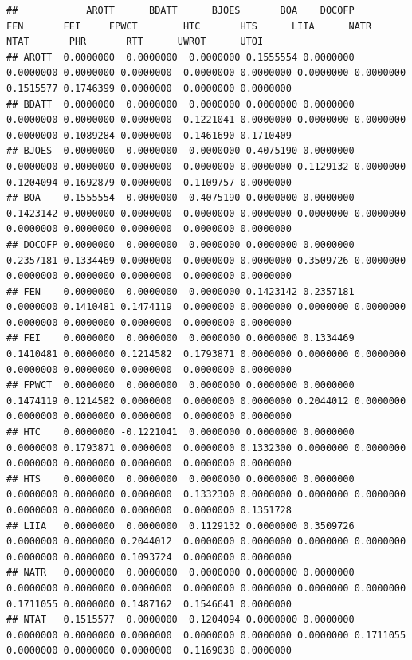\documentclass[
]{book}
\begin{document}
\begin{verbatim}
##            AROTT      BDATT      BJOES       BOA    DOCOFP       FEN       FEI     FPWCT        HTC       HTS      LIIA      NATR      NTAT       PHR       RTT      UWROT      UTOI
## AROTT  0.0000000  0.0000000  0.0000000 0.1555554 0.0000000 0.0000000 0.0000000 0.0000000  0.0000000 0.0000000 0.0000000 0.0000000 0.1515577 0.1746399 0.0000000  0.0000000 0.0000000
## BDATT  0.0000000  0.0000000  0.0000000 0.0000000 0.0000000 0.0000000 0.0000000 0.0000000 -0.1221041 0.0000000 0.0000000 0.0000000 0.0000000 0.1089284 0.0000000  0.1461690 0.1710409
## BJOES  0.0000000  0.0000000  0.0000000 0.4075190 0.0000000 0.0000000 0.0000000 0.0000000  0.0000000 0.0000000 0.1129132 0.0000000 0.1204094 0.1692879 0.0000000 -0.1109757 0.0000000
## BOA    0.1555554  0.0000000  0.4075190 0.0000000 0.0000000 0.1423142 0.0000000 0.0000000  0.0000000 0.0000000 0.0000000 0.0000000 0.0000000 0.0000000 0.0000000  0.0000000 0.0000000
## DOCOFP 0.0000000  0.0000000  0.0000000 0.0000000 0.0000000 0.2357181 0.1334469 0.0000000  0.0000000 0.0000000 0.3509726 0.0000000 0.0000000 0.0000000 0.0000000  0.0000000 0.0000000
## FEN    0.0000000  0.0000000  0.0000000 0.1423142 0.2357181 0.0000000 0.1410481 0.1474119  0.0000000 0.0000000 0.0000000 0.0000000 0.0000000 0.0000000 0.0000000  0.0000000 0.0000000
## FEI    0.0000000  0.0000000  0.0000000 0.0000000 0.1334469 0.1410481 0.0000000 0.1214582  0.1793871 0.0000000 0.0000000 0.0000000 0.0000000 0.0000000 0.0000000  0.0000000 0.0000000
## FPWCT  0.0000000  0.0000000  0.0000000 0.0000000 0.0000000 0.1474119 0.1214582 0.0000000  0.0000000 0.0000000 0.2044012 0.0000000 0.0000000 0.0000000 0.0000000  0.0000000 0.0000000
## HTC    0.0000000 -0.1221041  0.0000000 0.0000000 0.0000000 0.0000000 0.1793871 0.0000000  0.0000000 0.1332300 0.0000000 0.0000000 0.0000000 0.0000000 0.0000000  0.0000000 0.0000000
## HTS    0.0000000  0.0000000  0.0000000 0.0000000 0.0000000 0.0000000 0.0000000 0.0000000  0.1332300 0.0000000 0.0000000 0.0000000 0.0000000 0.0000000 0.0000000  0.0000000 0.1351728
## LIIA   0.0000000  0.0000000  0.1129132 0.0000000 0.3509726 0.0000000 0.0000000 0.2044012  0.0000000 0.0000000 0.0000000 0.0000000 0.0000000 0.0000000 0.1093724  0.0000000 0.0000000
## NATR   0.0000000  0.0000000  0.0000000 0.0000000 0.0000000 0.0000000 0.0000000 0.0000000  0.0000000 0.0000000 0.0000000 0.0000000 0.1711055 0.0000000 0.1487162  0.1546641 0.0000000
## NTAT   0.1515577  0.0000000  0.1204094 0.0000000 0.0000000 0.0000000 0.0000000 0.0000000  0.0000000 0.0000000 0.0000000 0.1711055 0.0000000 0.0000000 0.0000000  0.1169038 0.0000000

\end{verbatim}
\end{document}
